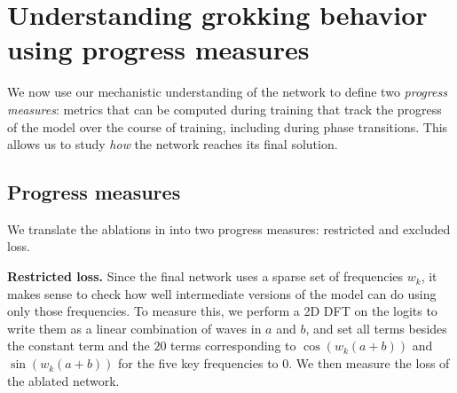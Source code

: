 \documentclass{article} %
\begin{document}
\section{Understanding grokking behavior using progress measures}

We now use our mechanistic understanding of the network to define two \textit{progress measures}: metrics that can be computed during training that track the progress of the model over the course of training, including during phase transitions. This allows us to study \textit{how} the network reaches its final solution.

\subsection{Progress measures}
\label{sec:progress-measures}
We translate the ablations in  into two progress measures: restricted and excluded loss.  %


\textbf{Restricted loss.} Since the final network uses a sparse set of frequencies $w_k$, it makes sense to check how well intermediate versions of the model can do using only those frequencies. To measure this, we perform a 2D DFT on the logits to write them as a linear combination of waves in $a$ and $b$, and set all terms besides the constant term and the $20$ terms corresponding to $\cos(w_k(a+b))$ and $\sin(w_k(a+b))$ for the five key frequencies to $0$. We then measure the loss of the ablated network.

\end{document}
